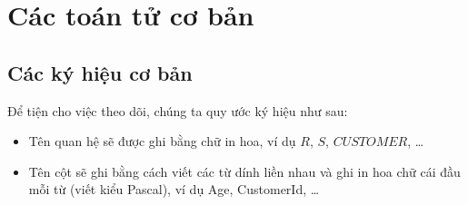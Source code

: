 \documentclass[11pt]{beamer}
\begin{document}
  \section{Các toán tử cơ bản}
  \subsection{Các ký hiệu cơ bản}
  \begin{frame}
    Để tiện cho việc theo dõi, chúng ta quy ước ký hiệu như sau:
    \begin{itemize}
      \item Tên quan hệ sẽ được ghi bằng chữ in hoa, ví dụ $R$, $S$, $CUSTOMER$, \dots
      \item Tên cột sẽ ghi bằng cách viết các từ dính liền nhau và ghi in hoa chữ cái đầu mỗi từ (viết kiểu Pascal), ví dụ
      Age, CustomerId, \dots 
    \end{itemize}
  \end{frame}
\end{document}
